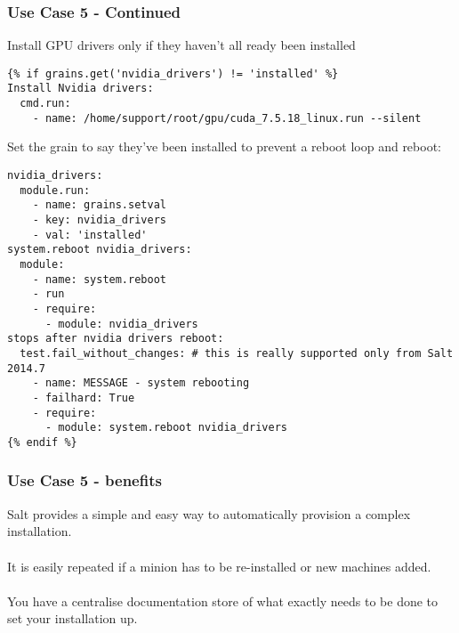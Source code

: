 \documentclass{beamer}
\begin{document}
\begin{frame}[fragile]
\frametitle{Use Case 5 - Continued}

Install GPU drivers only if they haven't all ready been installed \\

\begin{lstlisting}[basicstyle=\tiny,]
{% if grains.get('nvidia_drivers') != 'installed' %}
Install Nvidia drivers:
  cmd.run:
    - name: /home/support/root/gpu/cuda_7.5.18_linux.run --silent
\end{lstlisting}

Set the grain to say they've been installed to prevent a reboot loop and reboot:\\

\begin{lstlisting}[basicstyle=\tiny,]
nvidia_drivers:
  module.run:
    - name: grains.setval
    - key: nvidia_drivers
    - val: 'installed'
system.reboot nvidia_drivers:
  module:
    - name: system.reboot
    - run
    - require:
      - module: nvidia_drivers
stops after nvidia drivers reboot:
  test.fail_without_changes: # this is really supported only from Salt 2014.7
    - name: MESSAGE - system rebooting
    - failhard: True
    - require:
      - module: system.reboot nvidia_drivers
{% endif %}
\end{lstlisting}
\end{frame}

\begin{frame}
\frametitle{Use Case 5 - benefits}

Salt provides a simple and easy way to automatically provision a complex installation.\\~\\

It is easily repeated if a minion has to be re-installed or new machines added.\\~\\

You have a centralise documentation store of what exactly needs to be done to set your installation up.

\end{frame}

%
%
%
%
\end{document}
